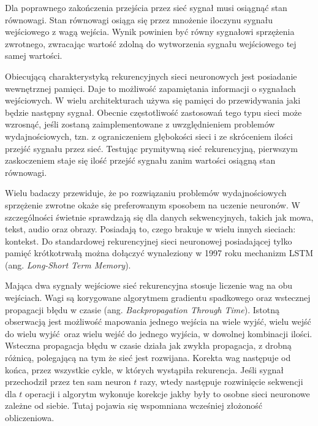 \documentclass[12pt,a4paper,twoside,titlepage,openright]{book}
\begin{document}
Dla poprawnego zakończenia przejścia przez sieć sygnał musi osiągnąć stan równowagi. Stan równowagi osiąga się przez mnożenie iloczynu sygnału wejściowego z wagą wejścia. Wynik powinien być równy sygnałowi sprzężenia zwrotnego, zwracając wartość zdolną do wytworzenia sygnału wejściowego tej samej wartości.

Obiecującą charakterystyką rekurencyjnych sieci neuronowych jest posiadanie wewnętrznej pamięci. Daje to możliwość zapamiętania informacji o sygnałach wejściowych. W wielu architekturach używa się pamięci do przewidywania jaki będzie następny sygnał. Obecnie częstotliwość zastosowań tego typu sieci może wzrosnąć, jeśli zostaną zaimplementowane z uwzględnieniem problemów wydajnościowych, tzn. z ograniczeniem głębokości sieci i ze skróceniem ilości przejść sygnału przez sieć. Testując prymitywną sieć rekurencyjną, pierwszym zaskoczeniem staje się ilość przejść sygnału zanim wartości osiągną stan równowagi.

Wielu badaczy \cite{siteRNN} przewiduje,  że po rozwiązaniu problemów wydajnościowych sprzężenie zwrotne okaże się preferowanym sposobem na uczenie neuronów. W szczególności świetnie sprawdzają się dla danych sekwencyjnych, takich jak mowa, tekst, audio oraz obrazy. Posiadają to, czego brakuje w wielu innych sieciach: kontekst. Do standardowej rekurencyjnej sieci neuronowej posiadającej tylko pamięć krótkotrwałą można dołączyć wynaleziony w 1997 roku mechanizm LSTM (ang. \textit{Long-Short Term Memory}). 

Mająca dwa sygnały wejściowe sieć rekurencyjna stosuje liczenie wag na obu wejściach. Wagi są korygowane algorytmem gradientu spadkowego oraz wstecznej propagacji błędu w czasie (ang. \textit{Backpropagation Through Time}). Istotną obserwacją jest możliwość mapowania jednego wejścia na wiele wyjść, wielu wejść do wielu wyjść oraz wielu wejść do jednego wyjścia, w dowolnej kombinacji ilości. Wsteczna propagacja błędu w czasie działa jak zwykła propagacja, z drobną różnicą, polegającą na tym że sieć jest rozwijana. Korekta wag następuje od końca, przez wszystkie cykle, w których wystąpiła rekurencja. Jeśli sygnał przechodził przez ten sam neuron $t$ razy, wtedy następuje rozwinięcie sekwencji dla $t$ operacji i algorytm wykonuje korekcje jakby były to osobne sieci neuronowe zależne od siebie. Tutaj pojawia się wspomniana wcześniej złożoność obliczeniowa.
\end{document}
